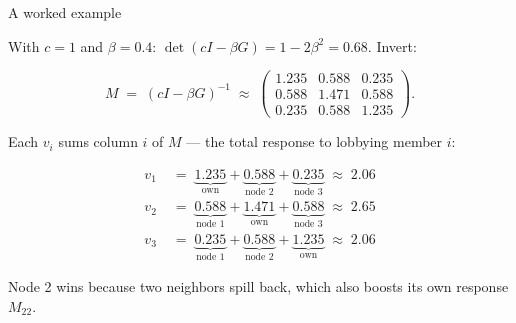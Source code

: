 \documentclass[aspectratio=169]{beamer}
\newcommand{\accentline}{\vspace{1pt}{\color{accent}\rule{0.3\textwidth}{1.5pt}}\vspace{4pt}}
\begin{document}
\begin{frame}{A worked example}
\accentline
\vspace{4pt}

{\small With $c = 1$ and $\beta = 0.4$: $\det(cI - \beta G) = 1 - 2\beta^2 = 0.68$. Invert:}

\vspace{-2pt}
\[
    M \;=\; (cI - \beta G)^{-1} \;\approx\;
    \begin{pmatrix}
    1.235 & 0.588 & 0.235 \\
    0.588 & 1.471 & 0.588 \\
    0.235 & 0.588 & 1.235
    \end{pmatrix}.
\]

{\small Each $v_i$ sums column $i$ of $M$ --- the total response to lobbying member $i$:}

\vspace{-4pt}
\[
\begin{aligned}
    v_1 &\;=\; \underbrace{1.235}_{\text{own}} + \underbrace{0.588}_{\text{node 2}} + \underbrace{0.235}_{\text{node 3}} \;\approx\; 2.06 \\
    v_2 &\;=\; \underbrace{0.588}_{\text{node 1}} + \underbrace{1.471}_{\text{own}} + \underbrace{0.588}_{\text{node 3}} \;\approx\; 2.65 \\
    v_3 &\;=\; \underbrace{0.235}_{\text{node 1}} + \underbrace{0.588}_{\text{node 2}} + \underbrace{1.235}_{\text{own}} \;\approx\; 2.06
\end{aligned}
\]

{\small\color{midgray} Node 2 wins because two neighbors spill back, which also boosts its own response $M_{22}$.}
\end{frame}
\end{document}

